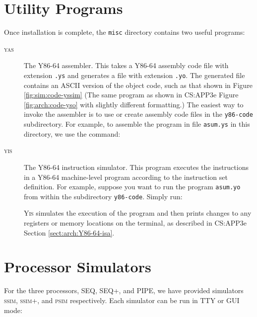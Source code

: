 \documentclass[11pt]{article}
\begin{document}
\section{Utility Programs}

Once installation is complete, the \texttt{misc} directory contains
two useful programs:

\begin{description}
\item[\textsc{yas}] The Y86-64 assembler.  This takes a Y86-64 assembly code
file with extension \texttt{.ys} and generates a file with
extension \texttt{.yo}.  The generated file contains an ASCII
version of the object code, such as that shown in Figure
\ref{fig:sim:code-yssim} (The same program as shown in CS:APP3e Figure
\ref{fig:arch:code-yso} with slightly different formatting.)  The easiest way to invoke the assembler is
to use or create assembly code files in the \texttt{y86-code}
subdirectory.  For example, to assemble the program in file
\texttt{asum.ys} in this directory, we use the command:
\begin{tty}
\end{tty}

\item[\textsc{yis}] The Y86-64 instruction simulator.  This program
executes the instructions in a Y86-64 machine-level program according to
the instruction set definition.  For example, suppose you want to run
the program \texttt{asum.yo} from within the subdirectory
\texttt{y86-code}.  Simply run:

\begin{tty}
\end{tty}

\textsc{Yis} simulates the execution of the program and then prints
 changes to any registers or memory locations on the terminal, as
 described in CS:APP3e Section \ref{sect:arch:Y86-64-isa}.
\end{description}

\section{Processor Simulators}

For the three processors, SEQ, SEQ+, and PIPE, we have
provided simulators \textsc{ssim}, \textsc{ssim+}, and
\textsc{psim} respectively. Each simulator can be run in 
TTY or GUI mode:
\end{document}
